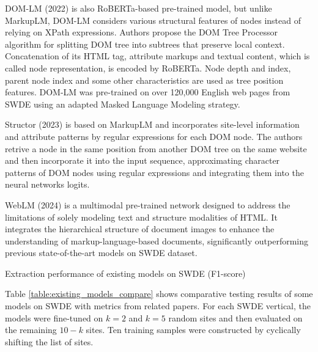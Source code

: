 DOM-LM \cite{domlm} (2022) is also RoBERTa-based pre-trained model, but unlike MarkupLM, DOM-LM considers various structural features of nodes instead of relying on XPath expressions. Authors propose the DOM Tree Processor algorithm for splitting DOM tree into subtrees that preserve local context. Concatenation of its HTML tag, attribute markups and textual content, which is called node representation, is encoded by RoBERTa. Node depth and index, parent node index and some other characteristics are used as tree position features. DOM-LM was pre-trained on over 120,000 English web pages from SWDE using an adapted Masked Language Modeling strategy.

Structor \cite{structor} (2023) is based on MarkupLM and incorporates site-level information and attribute patterns by regular expressions for each DOM node. The authors retrive a node in the same position from another DOM tree on the same website and then incorporate it into the input sequence, approximating character patterns of DOM nodes using regular expressions and integrating them into the neural networks logits.

WebLM \cite{weblm} (2024) is a multimodal pre-trained network designed to address the limitations of solely modeling text and structure modalities of HTML. It integrates the hierarchical structure of document images to enhance the understanding of markup-language-based documents, significantly outperforming previous state-of-the-art models on SWDE dataset.

\begin{table}[ht!]
\caption{Extraction performance of existing models on SWDE (F1-score)}
\label{table:existing_models_compare}
\begin{center}

\end{center}
\end{table}

Table \ref{table:existing_models_compare} shows comparative testing results of some models on SWDE with metrics from related papers. For each SWDE vertical, the models were fine-tuned on $k=2$ and $k=5$ random sites and then evaluated on the remaining $10 - k$ sites. Ten training samples were constructed by cyclically shifting the list of sites.
